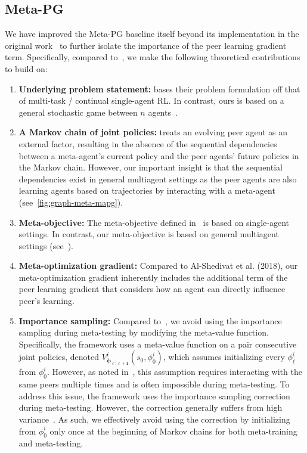 \subsection{Meta-PG}\label{sec:meta-pg-difference-details}
We have improved the Meta-PG baseline itself beyond its implementation in the original work~\citep{alshedivat2018continuous} to further isolate the importance of the peer learning gradient term.
Specifically, compared to~\citet{alshedivat2018continuous}, we make the following theoretical contributions to build on:
\begin{enumerate}[leftmargin=*, wide, labelindent=0pt, topsep=0pt, label=\arabic*)]
    \itemsep0em 
    \item \textbf{Underlying problem statement:} \citet{alshedivat2018continuous} bases their problem formulation off that of multi-task / continual single-agent RL. In contrast, ours is based on a general stochastic game between $n$ agents~\citep{shapley53stochastic}.
    \item \textbf{A Markov chain of joint policies:} \citet{alshedivat2018continuous} treats an evolving peer agent as an external factor, resulting in the absence of the sequential dependencies between a meta-agent's current policy and the peer agents' future policies in the Markov chain. However, our important insight is that the sequential dependencies exist in general multiagent settings as the peer agents are also learning agents based on trajectories by interacting with a meta-agent (see~\cref{fig:graph-meta-mapg}). 
    \item \textbf{Meta-objective:} The meta-objective defined in~\citet{alshedivat2018continuous} is based on single-agent settings. In contrast, our meta-objective is based on general multiagent settings (see~).
    \item \textbf{Meta-optimization gradient:} Compared to Al-Shedivat et al. (2018), our meta-optimization gradient inherently includes the additional term of the peer learning gradient that considers how an agent can directly influence peer's learning.
    \item \textbf{Importance sampling:} Compared to~\citet{alshedivat2018continuous}, we avoid using the importance sampling during meta-testing by modifying the meta-value function. Specifically, the framework uses a meta-value function on a pair consecutive joint policies, denoted $V^{i}_{\bm{\phi}_{\bm{\ell:\ell+1}}}(s_0,\phi^{i}_{0})$, which assumes initializing every $\phi^{i}_{\ell}$ from $\phi^{i}_{0}$. However, as noted in~\citet{alshedivat2018continuous}, this assumption requires interacting with the same peers multiple times and is often impossible during meta-testing. To address this issue, the framework uses the importance sampling correction during meta-testing. However, the correction generally suffers from high variance~\citep{wang16acer}. As such, we effectively avoid using the correction by initializing from $\phi^{i}_{0}$ only once at the beginning of Markov chains for both meta-training and meta-testing. 
\end{enumerate}
